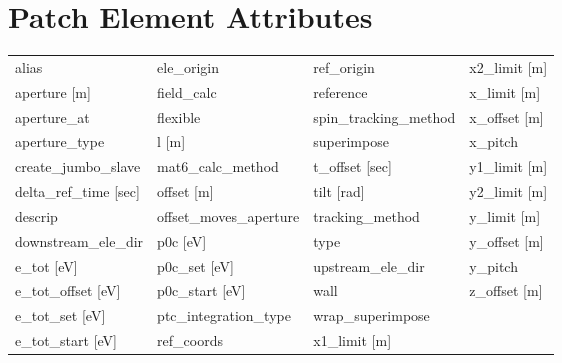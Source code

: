  \section{Patch Element Attributes}
 \label{s:list.patch}
 
 \begin{tabular}{llll} \toprule
alias                            & ele_origin                       & ref_origin                       & x2_limit [m]                     \\
aperture [m]                     & field_calc                       & reference                        & x_limit [m]                      \\
aperture_at                      & flexible                         & spin_tracking_method             & x_offset [m]                     \\
aperture_type                    & l [m]                            & superimpose                      & x_pitch                          \\
create_jumbo_slave               & mat6_calc_method                 & t_offset [sec]                   & y1_limit [m]                     \\
delta_ref_time [sec]             & offset [m]                       & tilt [rad]                       & y2_limit [m]                     \\
descrip                          & offset_moves_aperture            & tracking_method                  & y_limit [m]                      \\
downstream_ele_dir               & p0c [eV]                         & type                             & y_offset [m]                     \\
e_tot [eV]                       & p0c_set [eV]                     & upstream_ele_dir                 & y_pitch                          \\
e_tot_offset [eV]                & p0c_start [eV]                   & wall                             & z_offset [m]                     \\
e_tot_set [eV]                   & ptc_integration_type             & wrap_superimpose                 &                                  \\
e_tot_start [eV]                 & ref_coords                       & x1_limit [m]                     &                                  \\
 \bottomrule
 \end{tabular}
 \vfill
 
